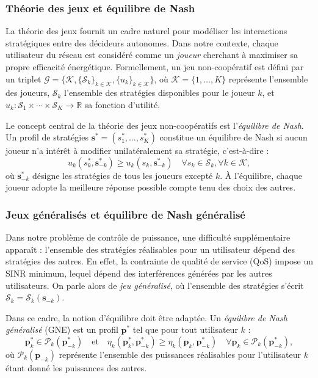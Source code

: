 \documentclass[conference]{IEEEtran}
\begin{document}
\subsubsection{Théorie des jeux et équilibre de Nash}

La théorie des jeux fournit un cadre naturel pour modéliser les interactions stratégiques entre des décideurs autonomes. Dans notre contexte, chaque utilisateur du réseau est considéré comme un \textit{joueur} cherchant à maximiser sa propre efficacité énergétique. Formellement, un jeu non-coopératif est défini par un triplet $\mathcal{G} = \{\mathcal{K}, \{\mathcal{S}_k\}_{k\in\mathcal{K}}, \{u_k\}_{k\in\mathcal{K}}\}$, où $\mathcal{K} = \{1,\dots,K\}$ représente l'ensemble des joueurs, $\mathcal{S}_k$ l'ensemble des stratégies disponibles pour le joueur $k$, et $u_k : \mathcal{S}_1 \times \cdots \times \mathcal{S}_K \to \mathbb{R}$ sa fonction d'utilité.

Le concept central de la théorie des jeux non-coopératifs est l'\textit{équilibre de Nash}. Un profil de stratégies $\mathbf{s}^* = (s_1^*, \dots, s_K^*)$ constitue un équilibre de Nash si aucun joueur n'a intérêt à modifier unilatéralement sa stratégie, c'est-à-dire :
\[
u_k(s_k^*, \mathbf{s}_{-k}^*) \geq u_k(s_k, \mathbf{s}_{-k}^*) \quad \forall s_k \in \mathcal{S}_k, \forall k \in \mathcal{K},
\]
où $\mathbf{s}_{-k}^*$ désigne les stratégies de tous les joueurs excepté $k$. À l'équilibre, chaque joueur adopte la meilleure réponse possible compte tenu des choix des autres.

\subsubsection{Jeux généralisés et équilibre de Nash généralisé}

Dans notre problème de contrôle de puissance, une difficulté supplémentaire apparaît : l'ensemble des stratégies réalisables pour un utilisateur dépend des stratégies des autres. En effet, la contrainte de qualité de service (QoS) impose un SINR minimum, lequel dépend des interférences générées par les autres utilisateurs. On parle alors de \textit{jeu généralisé}, où l'ensemble des stratégies s'écrit $\mathcal{S}_k = \mathcal{S}_k(\mathbf{s}_{-k})$.

Dans ce cadre, la notion d'équilibre doit être adaptée. Un \textit{équilibre de Nash généralisé} (GNE) est un profil $\mathbf{p}^*$ tel que pour tout utilisateur $k$ :
\[
\mathbf{p}_k^* \in \mathcal{P}_k(\mathbf{p}_{-k}^*) \quad \text{et} \quad \eta_k(\mathbf{p}_k^*, \mathbf{p}_{-k}^*) \geq \eta_k(\mathbf{p}_k, \mathbf{p}_{-k}^*) \quad \forall \mathbf{p}_k \in \mathcal{P}_k(\mathbf{p}_{-k}^*),
\]
où $\mathcal{P}_k(\mathbf{p}_{-k})$ représente l'ensemble des puissances réalisables pour l'utilisateur $k$ étant donné les puissances des autres.
\end{document}
